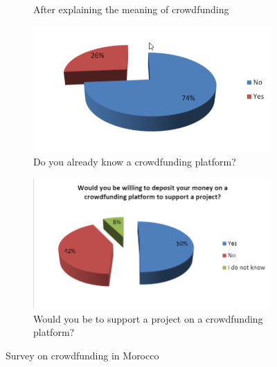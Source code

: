 \begin{figure}
\begin{subfigure}[b]{0.45\textwidth}
          \caption{After explaining the meaning of crowdfunding}
          \label{fig:knowCrowd}
      \end{subfigure}
      \hfill
      \begin{subfigure}[b]{0.45\textwidth}
          \centering
          \includegraphics[width=\textwidth]{assets/knowPlatform.png}
          \caption{Do you already know a crowdfunding platform?}
          \label{fig:knowPlatform}
      \end{subfigure}
      \hfill
      \begin{subfigure}[b]{0.45\textwidth}
          \centering
          \includegraphics[width=\textwidth]{assets/willing.png}
          \caption{Would you be to support a project on a crowdfunding platform?}
          \label{fig:willing}
      \end{subfigure}
      
      \caption{Survey on crowdfunding in Morocco \cite{crowdMorocco}}
      \label{fig:survey}
\end{figure}





